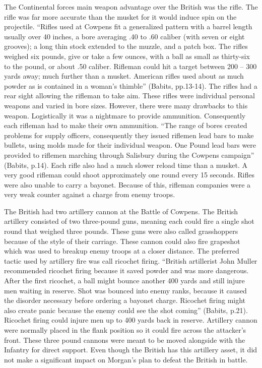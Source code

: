 The Continental forces main weapon advantage over the British was the rifle.
The rifle was far more accurate than the musket for it would induce spin on the
projectile.  “Rifles used at Cowpens fit a generalized pattern with a barrel
length usually over 40 inches, a bore averaging .40 to .60 caliber (with seven
or eight grooves); a long thin stock extended to the muzzle, and a patch box.
The rifles weighed six pounds, give or take a few ounces, with a ball as small
as thirty-six to the pound, or about .50 caliber.  Rifleman could hit a target
between 200 – 300 yards away; much further than a musket.  American rifles used
about as much powder as is contained in a woman’s thimble” (Babits, pp.13-14).
The rifles had a rear sight allowing the rifleman to take aim.  These rifles
were individual personal weapons and varied in bore sizes.  However, there were
many drawbacks to this weapon.  Logistically it was a nightmare to provide
ammunition.  Consequently each rifleman had to make their own ammunition.  “The
range of bores created problems for supply officers, consequently they issued
riflemen lead bars to make bullets, using molds made for their individual
weapon.  One Pound lead bars were provided to riflemen marching through
Salisbury during the Cowpens campaign” (Babits, p.14).  Each rifle also had a
much slower reload time than a musket.  A very good rifleman could shoot
approximately one round every 15 seconds.  Rifles were also unable to carry a
bayonet.  Because of this, rifleman companies were a very weak counter against a
charge from enemy troops.

The British had two artillery cannon at the Battle of Cowpens.  The British
artillery consisted of two three-pound guns, meaning each could fire a single
shot round that weighed three pounds.   These guns were also called grasshoppers
because of the style of their carriage.  These cannon could also fire grapeshot
which was used to breakup enemy troops at a closer distance.  The preferred
tactic used by artillery fire was call ricochet firing. “British artillerist
John Muller recommended ricochet firing because it saved powder and was more
dangerous.  After the first ricochet, a ball might bounce another 400 yards and
still injure men waiting in reserve.  Shot was bounced into enemy ranks, because
it caused the disorder necessary before ordering a bayonet charge.  Ricochet
firing might also create panic because the enemy could see the shot coming”
(Babits, p.21).  Ricochet firing could injure men up to 400 yards back in
reserve.  Artillery cannon were normally placed in the flank position so it
could fire across the attacker’s front.  These three pound cannons were meant to
be moved alongside with the Infantry for direct support.  Even though the
British has this artillery asset, it did not make a significant impact on
Morgan’s plan to defeat the British in battle.   

